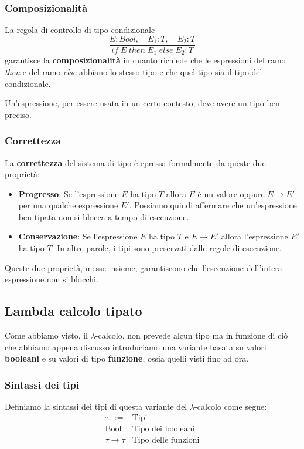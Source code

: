 \subsubsection{Composizionalità}
La regola di controllo di tipo condizionale
\[ \frac{E : Bool, \quad E_1 : T, \quad E_2 : T}{if \; E \; then \; E_1 \; else \; E_2 : T} \]
garantisce la \textbf{composizionalità} in quanto richiede che le espressioni del ramo \emph{then} e del ramo \emph{else}
abbiano lo stesso tipo e che quel tipo sia il tipo del condizionale.

Un'espressione, per essere usata in un certo contesto, deve avere un tipo ben preciso.

\subsubsection{Correttezza}
La \textbf{correttezza} del sistema di tipo è epressa formalmente da queste due proprietà:
\begin{itemize}
	\item \textbf{Progresso}: Se l'espressione $E$ ha tipo $T$ allora $E$ è un valore oppure $E \rightarrow E'$ per una
	      qualche espressione $E'$. Possiamo quindi affermare che un'espressione ben tipata non si blocca a tempo di
	      esecuzione.
	\item \textbf{Conservazione}: Se l'espressione $E$ ha tipo $T$ e $E \rightarrow E'$ allora l'espressione $E'$ ha
	      tipo $T$. In altre parole, i tipi sono preservati dalle regole di esecuzione.
\end{itemize}
Queste due proprietà, messe insieme, garantiscono che l'esecuzione dell'intera espressione non si blocchi.

\subsection{Lambda calcolo tipato}
Come abbiamo visto, il $\lambda$-calcolo, non prevede alcun tipo ma in funzione di ciò che abbiamo appena discusso introduciamo
una variante basata su valori \textbf{booleani} e su valori di tipo \textbf{funzione}, ossia quelli visti fino ad ora.

\subsubsection{Sintassi dei tipi}
Definiamo la sintassi dei tipi di questa variante del $\lambda$-calcolo come segue:
\[
	\begin{array}{lr}
		\tau ::=              & \text{Tipi}                \\
		\text{Bool}           & \text{Tipo dei booleani}   \\
		\tau \rightarrow \tau & \text{Tipo delle funzioni}
	\end{array}
\]